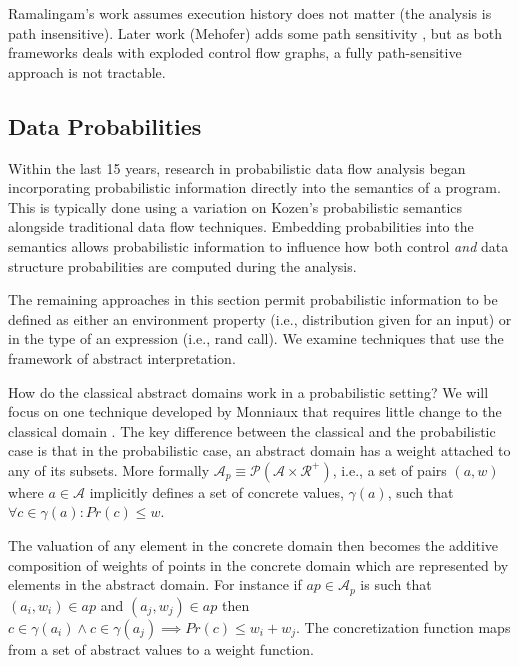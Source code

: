 
Ramalingam's work assumes execution history does not matter 
(the analysis is path insensitive).
Later work (Mehofer) adds some path sensitivity \cite{mehofer2001novel}, 
but as both frameworks deals with exploded control flow graphs, a fully 
path-sensitive approach is not tractable.

\subsection{Data Probabilities}

Within the last 15 years, research in probabilistic data flow analysis
began incorporating probabilistic information directly into
the semantics of a program.
This is typically done using a variation on Kozen's 
probabilistic semantics alongside traditional data
flow techniques.
Embedding probabilities into the semantics allows probabilistic
information to influence how both control {\sl and} data structure
probabilities are computed during the analysis.

The remaining approaches in this section permit probabilistic
information to be defined as either an environment property
(i.e., distribution given for an input) or in the type of
an expression (i.e., rand call).
We examine techniques that use the framework of abstract
interpretation.

How do the classical abstract domains work in a
probabilistic setting?
We will focus on one technique developed by Monniaux
that requires little change to the classical domain 
\cite{monniaux2001backwards}.
The key difference between the classical and the probabilistic 
case is that in the probabilistic case, 
an abstract domain has a weight attached to any of its subsets.
More formally
$\mathcal{A}_p \equiv \mathcal{P}(\mathcal{A} \times \mathcal{R}^+)$, 
i.e., a set of pairs $(a,w)$ where $a \in \mathcal{A}$ implicitly
defines a set of concrete values, $\gamma(a)$, such that
$\forall c \in \gamma(a) : Pr(c) \le w$.

The valuation of any element in the concrete domain then 
becomes the additive composition of weights of points in 
the concrete domain which are represented by elements in
the abstract domain.
For instance if $ap \in \mathcal{A}_p$ is such that
$(a_i,w_i) \in ap$ and 
$(a_j,w_j) \in ap$ then $c \in \gamma(a_i) \wedge
c \in \gamma(a_j) \implies Pr(c) \le w_i + w_j$.
The concretization function maps from a set of abstract
values to a weight function.

